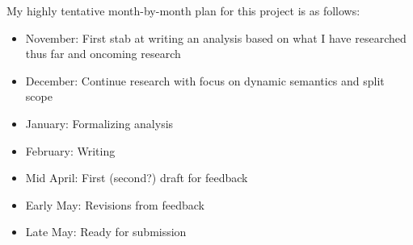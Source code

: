 \documentclass[11pt]{article}
\begin{document}
My highly tentative month-by-month plan for this project is as follows:
\begin{itemize}
	\item {November: First stab at writing an analysis based on what I have researched thus far and oncoming research}
	\item {December: Continue research with focus on dynamic semantics and split scope}
	\item {January: Formalizing analysis}
	\item {February: Writing}
	\item {Mid April: First (second?) draft for feedback}
	\item {Early May: Revisions from feedback}
	\item {Late May: Ready for submission}
\end{itemize}

\printbibliography
\end{document}
